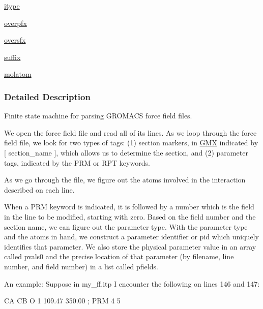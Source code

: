 \begin{DoxyCompactItemize}
\hyperlink{classsrc_1_1gmxio_1_1ITP__Reader_aaaafaaf937397d5d543678d8eca71f56}{itype}
\item 
\hyperlink{classsrc_1_1gmxio_1_1ITP__Reader_a42d099927c66be494198125649c1fc08}{overpfx}
\item 
\hyperlink{classsrc_1_1gmxio_1_1ITP__Reader_a10bf4a140a281780b8430b3ceb4402e4}{oversfx}
\item 
\hyperlink{classsrc_1_1gmxio_1_1ITP__Reader_af4b9cf536091bc0a1d784f8e17905838}{suffix}
\item 
\hyperlink{classsrc_1_1gmxio_1_1ITP__Reader_a6b20408a9084dfa267bfa297a42c0468}{molatom}
\end{DoxyCompactItemize}


\subsubsection{Detailed Description}
Finite state machine for parsing G\+R\+O\+M\+A\+CS force field files. 

We open the force field file and read all of its lines. As we loop through the force field file, we look for two types of tags\+: (1) section markers, in \hyperlink{classsrc_1_1gmxio_1_1GMX}{G\+MX} indicated by \mbox{[} section\+\_\+name \mbox{]}, which allows us to determine the section, and (2) parameter tags, indicated by the \textquotesingle{}P\+RM\textquotesingle{} or \textquotesingle{}R\+PT\textquotesingle{} keywords.

As we go through the file, we figure out the atoms involved in the interaction described on each line.

When a \textquotesingle{}P\+RM\textquotesingle{} keyword is indicated, it is followed by a number which is the field in the line to be modified, starting with zero. Based on the field number and the section name, we can figure out the parameter type. With the parameter type and the atoms in hand, we construct a \textquotesingle{}parameter identifier\textquotesingle{} or pid which uniquely identifies that parameter. We also store the physical parameter value in an array called \textquotesingle{}pvals0\textquotesingle{} and the precise location of that parameter (by filename, line number, and field number) in a list called \textquotesingle{}pfields\textquotesingle{}.

An example\+: Suppose in \textquotesingle{}my\+\_\+ff.\+itp\textquotesingle{} I encounter the following on lines 146 and 147\+:


\begin{DoxyCode}
[ angletypes ]
CA   CB   O   1   109.47  350.00  ; PRM 4 5
\end{DoxyCode}


